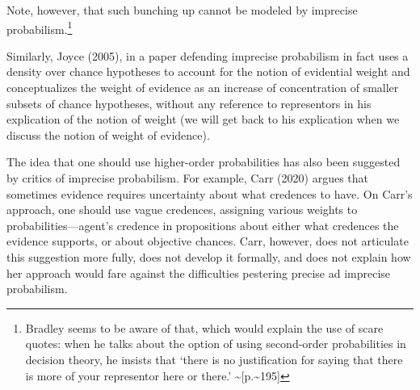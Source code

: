 \documentclass[
  10pt,
  dvipsnames,enabledeprecatedfontcommands]{scrartcl}
\begin{document}
\noindent Note, however, that such bunching up cannot be modeled by
imprecise probabilism.\footnote{Bradley seems to be aware of that, which
  would explain the use of scare quotes: when he talks about the option
  of using second-order probabilities in decision theory, he insists
  that `there is no justification for saying that there is more of your
  representor here or there.' \textasciitilde{[}p.\textasciitilde195{]}}

Similarly, Joyce (2005), in a paper defending imprecise probabilism in
fact uses a density over chance hypotheses to account for the notion of
evidential weight and conceptualizes the weight of evidence as an
increase of concentration of smaller subsets of chance hypotheses,
without any reference to representors in his explication of the notion
of weight (we will get back to his explication when we discuss the
notion of weight of evidence).

The idea that one should use higher-order probabilities has also been
suggested by critics of imprecise probabilism. For example, Carr (2020)
argues that sometimes evidence requires uncertainty about what credences
to have. On Carr's approach, one should use vague credences, assigning
various weights to probabilities---agent's credence in propositions
about either what credences the evidence supports, or about objective
chances. Carr, however, does not articulate this suggestion more fully,
does not develop it formally, and does not explain how her approach
would fare against the difficulties pestering precise ad imprecise
probabilism.
\end{document}
